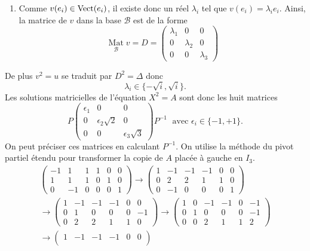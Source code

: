 \begin{enumerate}
\begin{enumerate}
   \item Comme  $v(e_i)\in \operatorname{Vect} (e_i)$, il existe donc un réel $\lambda_i$ tel que $v(e_i)=\lambda_ie_i$. Ainsi, la matrice de $v$ dans la base $\mathcal B$ est de la forme
\[%
\underset{\mathcal{B}}{\mathop{\mathrm{Mat}}}v=D=
\begin{pmatrix}
\lambda_1 & 0 & 0 \\ 
0 & \lambda_2 & 0 \\ 
0 & 0 & \lambda_3
\end{pmatrix} 
\]
      \end{enumerate}
De plus $v^2=u$ se traduit par $D^2=\Delta$ donc 
\[\lambda_i\in \{-\sqrt{i}, \sqrt{i}\}.\]
Les solutions matricielles de l'équation $X^2=A$ sont donc les huit matrices 
\[
P \begin{pmatrix}
\epsilon_1 & 0 & 0 \\ 
0 & \epsilon_2 \sqrt{2}& 0 \\ 
0 & 0 & \epsilon_3 \sqrt{3}
\end{pmatrix} P^{-1}
\; \text{ avec } \epsilon_i\in \{-1,+1\}.
\]
On peut préciser ces matrices en calculant $P^{-1}$. On utilise la méthode du pivot partiel étendu pour transformer la copie de $A$ placée à gauche en $I_3$.
\begin{multline*}
 \begin{pmatrix}
-1 & 1 & 1 & 1 & 0 & 0 \\ 
1  & 1 & 1 & 0 & 1 & 0 \\ 
0 & -1 & 0 & 0 & 0 & 1
\end{pmatrix}
 \rightarrow
 \begin{pmatrix}
1 & -1 & -1 & -1 & 0 & 0 \\ 
0 & 2 & 2 & 1 & 1 & 0 \\ 
0 & -1 & 0 & 0 & 0 & 1
\end{pmatrix} \\
 \rightarrow 
\begin{pmatrix}
1 & -1 & -1 & -1 & 0 & 0 \\ 
0 & 1 & 0 & 0 & 0 & -1 \\
0 & 2 & 2 & 1 & 1 & 0 
\end{pmatrix}
 \rightarrow
\begin{pmatrix}
1 & 0 & -1 & -1 & 0 & -1 \\ 
0 & 1 & 0 & 0 & 0 & -1 \\
0 & 0 & 2 & 1 & 1 & 2
\end{pmatrix} \\
 \rightarrow 
\begin{pmatrix}
1 & -1 & -1 & -1 & 0 & 0 \\ 

\end{pmatrix}
\end{multline*}
\end{enumerate}
